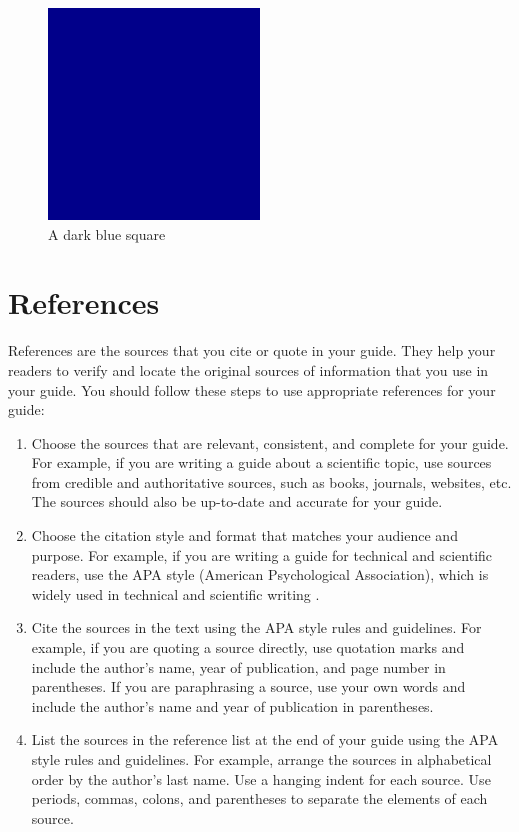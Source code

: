 \documentclass[12pt]{article}
\begin{document}
\begin{figure}[h]
    \centering
    \includegraphics[width=0.5\textwidth]{images/example-figure1.jpg}
    \caption{A dark blue square} \label{fig:blue}
\end{figure}

\pagebreak

\section{References}

References are the sources that you cite or quote in your guide. They help your readers to verify and locate the original sources of information that you use in your guide. You should follow these steps to use appropriate references for your guide:

\begin{enumerate}
    \item Choose the sources that are relevant, consistent, and complete for your guide. For example, if you are writing a guide about a scientific topic, use sources from credible and authoritative sources, such as books, journals, websites, etc. The sources should also be up-to-date and accurate for your guide.
    \item Choose the citation style and format that matches your audience and purpose. For example, if you are writing a guide for technical and scientific readers, use the APA style (American Psychological Association), which is widely used in technical and scientific writing \cite{apa}.
    \item Cite the sources in the text using the APA style rules and guidelines. For example, if you are quoting a source directly, use quotation marks and include the author's name, year of publication, and page number in parentheses. If you are paraphrasing a source, use your own words and include the author's name and year of publication in parentheses.
    \item List the sources in the reference list at the end of your guide using the APA style rules and guidelines. For example, arrange the sources in alphabetical order by the author's last name. Use a hanging indent for each source. Use periods, commas, colons, and parentheses to separate the elements of each source.
\end{enumerate}
\end{document}
